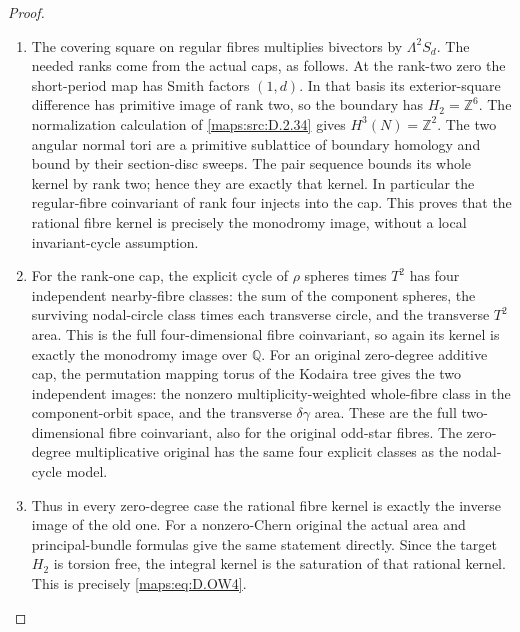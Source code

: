 \begin{proof}
\begin{enumerate}[label=\arabic*.,leftmargin=*]
\item The covering square on regular fibres multiplies
bivectors by $\Lambda^2S_d$. The needed ranks come
from the actual caps, as follows. At the rank-two
zero the short-period map has Smith factors $(1,d)$.
In that basis its exterior-square difference has
primitive image of rank two, so the boundary has
$H_2=\mathbb Z^6$. The normalization calculation of
\ref{maps:src:D.2.34} gives $H^3(N)=\mathbb Z^2$. The two angular
normal tori are a primitive sublattice of boundary
homology and bound by their section-disc sweeps.
The pair sequence bounds its whole kernel by rank
two; hence they are exactly that kernel. In
particular the regular-fibre coinvariant of rank
four injects into the cap. This proves that the
rational fibre kernel is precisely the monodromy
image, without a local invariant-cycle assumption.

\item For the rank-one cap, the explicit cycle of
$\rho$ spheres times $T^2$ has four independent
nearby-fibre classes: the sum of the component
spheres, the surviving nodal-circle class times
each transverse circle, and the transverse
$T^2$ area. This is the full four-dimensional
fibre coinvariant, so again its kernel is exactly
the monodromy image over $\mathbb Q$. For an
original zero-degree additive cap, the permutation
mapping torus of the Kodaira tree gives the two
independent images: the nonzero multiplicity-weighted
whole-fibre class in the component-orbit space,
and the transverse $\delta\gamma$ area. These
are the full two-dimensional fibre coinvariant,
also for the original odd-star fibres. The
zero-degree multiplicative original has the same
four explicit classes as the nodal-cycle model.

\item Thus in every zero-degree case the rational
fibre kernel is exactly the inverse image of
the old one. For a nonzero-Chern original the
actual area and principal-bundle formulas give
the same statement directly. Since the target
$H_2$ is torsion free, the integral kernel is the
saturation of that rational kernel. This is
precisely \eqref{maps:eq:D.OW4}.


\end{enumerate}
\end{proof}
